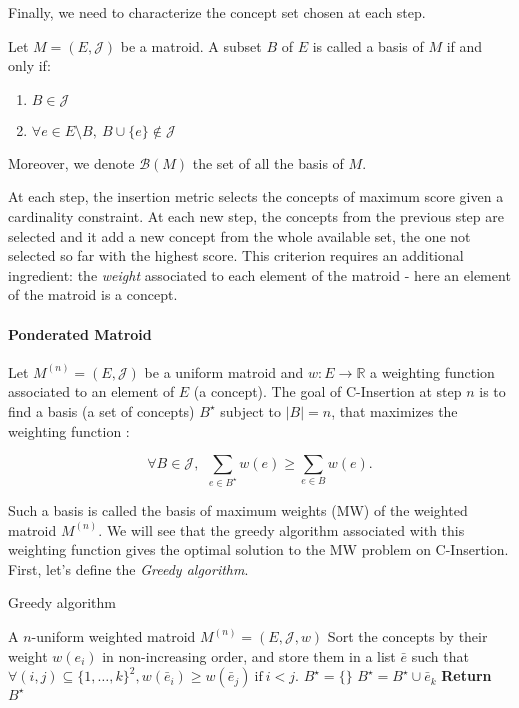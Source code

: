 Finally, we need to characterize the concept set chosen at each step.

\begin{definition} 
Let $M = (E, \mathcal{J})$ be a matroid. A subset $B$ of $E$ is called a basis of $M$ if and only if:
\begin{enumerate}
  \item $B \in \mathcal{J}$
  \item $\forall e \in E \setminus B, ~ B \cup \{e\} \notin \mathcal{J}$
\end{enumerate}
Moreover, we denote $\mathcal{B}(M)$ the set of all the basis of $M$.
\end{definition}


At each step, the insertion metric selects the concepts of maximum score given a cardinality constraint. At each new step, the concepts from the previous step are selected and it add a new concept from the whole available set, the one not selected so far with the highest score.  
This criterion requires an additional ingredient: the \emph{weight} associated to each element of the matroid - here an element of the matroid is a concept.

\paragraph{Ponderated Matroid}

Let $M^{(n)} = (E, \mathcal{J})$ be a uniform matroid and $w : E \to \mathbb{R}$ a weighting function associated to an element of $E$ (a concept).
The goal of C-Insertion at step $n$ is to find a basis (a set of concepts) $B^\star$ subject to $|B| = n$, that maximizes the weighting function : 

$$
\forall B \in \mathcal{J}, ~~ \sum_{e \in B^\star} w(e) \geq \sum_{e \in B} w(e).
$$

Such a basis is called the basis of maximum weights (MW) of the weighted matroid $M^{(n)}$. We will see that the greedy algorithm associated with this weighting function gives the optimal solution to the MW problem on C-Insertion. First, let's define the \emph{Greedy algorithm}.

\begin{algorithm}[ht]
\caption{Greedy algorithm}\label{alg:greedy_matroide}
\begin{algorithmic}
  \REQUIRE A $n$-uniform weighted matroid $M^{(n)} = (E, \mathcal{J}, w)$
  \STATE Sort the concepts by their weight $w(e_i)$ in non-increasing order, and store them in a list $\bar{e}$ such that~${\forall (i, j) \subseteq \{1, \ldots, k\}^2, w(\bar{e}_i) \geq w(\bar{e}_j) ~ \text{if} ~ i < j}$.
  \STATE $B^{\star} = \{\}$
    \STATE $B^{\star} = B^{\star} \cup \bar{e}_k$ %
  \ENDFOR
  \STATE \textbf{Return} $B^{\star}$
\end{algorithmic}
\end{algorithm}


